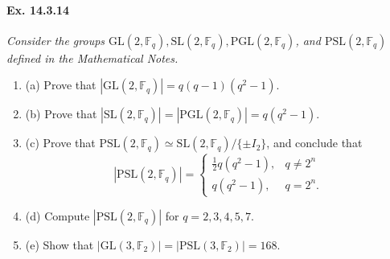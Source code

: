 \documentclass[11pt,a4paper]{article}
\newcommand{\be} {\begin{enumerate}}
\newcommand{\ee} {\end{enumerate}}
\newcommand{\F}{\mathbb{F}}
\begin{document}
 
  \paragraph{Ex. 14.3.14}{\it Consider the groups $\mathrm{GL}(2,\F_q), \mathrm{SL}(2,\F_q), \mathrm{PGL}(2,\F_q)$, and $\mathrm{PSL}(2,\F_q)$ defined in the Mathematical Notes.
  \be
  \item[(a)] Prove that $|\mathrm{GL}(2,\F_q)| = q(q-1)(q^2-1)$.
  \item[(b)] Prove that $|\mathrm{SL}(2,\F_q)|= | \mathrm{PGL}(2,\F_q)| = q(q^2-1)$.
  \item[(c)] Prove that $\mathrm{PSL}(2,\F_q) \simeq \mathrm{SL}(2,\F_q)/\{\pm I_2\}$, and conclude that
  $$|\mathrm{PSL}(2,\F_q)| = 
  \left\{
  \begin{array}{ll}
  \frac{1}{2} q (q^2-1),&q\ne 2^n\\
  q(q^2-1), & q=2^n.
  \end{array}
  \right.
  $$
  \item[(d)] Compute $|\mathrm{PSL}(2,\F_q)|$ for $q=2,3,4,5,7$.
  \item[(e)] Show that $|\mathrm{GL}(3,\F_2)| = |\mathrm{PSL}(3,\F_2)| = 168$.
  \ee
  }
\end{document}
